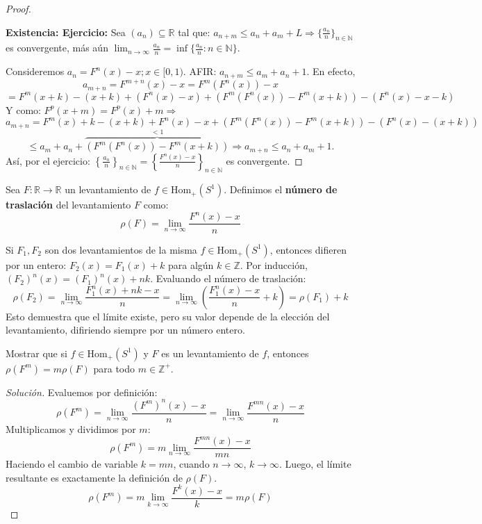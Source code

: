 \begin{proof}
\begin{figure}[htbp]
	\end{figure}
	
	\textbf{Existencia: Ejercicio:} Sea $(a_n) \subseteq \mathbb{R}$ tal que: $a_{n+m} \le a_n + a_m + L \Rightarrow \{\frac{a_n}{n}\}_{n \in \mathbb{N}}$ es convergente, más aún $\lim_{n \to \infty} \frac{a_n}{n} = \inf \{ \frac{a_n}{n} : n \in \mathbb{N} \}$.
	
	Consideremos $a_n = F^n(x) - x ; x \in [0,1)$. AFIR: $a_{n+m} \le a_m + a_n + 1$. En efecto,
	$$ a_{m+n} = F^{m+n}(x) - x = F^m(F^n(x)) - x $$
	$$ = F^m(x+k) - (x+k) + (F^n(x) - x) + (F^m(F^n(x)) - F^m(x+k)) - (F^n(x) - x - k) $$
	Y como: $F^p(x+m) = F^p(x)+m \Rightarrow$
	$$ a_{m+n} = F^m(x) + k - (x+k) + F^n(x) - x + (F^m(F^n(x)) - F^m(x+k)) - (F^n(x) - (x+k)) $$
	$$ \le a_m + a_n + \overbrace{(F^m(F^n(x)) - F^m(x+k))}^{< 1} \Rightarrow a_{m+n} \le a_n + a_m + 1. $$
	Así, por el ejercicio: $\left\{ \frac{a_n}{n} \right\}_{n \in \mathbb{N}} = \left\{ \frac{F^n(x)-x}{n} \right\}_{n \in \mathbb{N}}$ es convergente.
\end{proof}

\begin{definicion}
	Sea $F: \mathbb{R} \to \mathbb{R}$ un levantamiento de $f \in \text{Hom}_+(S^1)$. Definimos el \textbf{número de traslación} del levantamiento $F$ como:
	$$ \rho(F) = \lim_{n \to \infty} \frac{F^n(x) - x}{n} $$
\end{definicion}

\begin{observacion}
	Si $F_1, F_2$ son dos levantamientos de la misma $f \in \text{Hom}_+(S^1)$, entonces difieren por un entero: $F_2(x) = F_1(x) + k$ para algún $k \in \mathbb{Z}$.
	Por inducción, $(F_2)^n(x) = (F_1)^n(x) + n k$.
	Evaluando el número de traslación:
	$$ \rho(F_2) = \lim_{n \to \infty} \frac{F_1^n(x) + nk - x}{n} = \lim_{n \to \infty} \left( \frac{F_1^n(x) - x}{n} + k \right) = \rho(F_1) + k $$
	Esto demuestra que el límite existe, pero su valor depende de la elección del levantamiento, difiriendo siempre por un número entero.
\end{observacion}

\begin{ejercicio}
	Mostrar que si $f \in \text{Hom}_+(S^1)$ y $F$ es un levantamiento de $f$, entonces $\rho(F^m) = m \rho(F)$ para todo $m \in \mathbb{Z}^+$.
\end{ejercicio}
\begin{proof}[Solución]
	Evaluemos por definición:
	$$ \rho(F^m) = \lim_{n \to \infty} \frac{(F^m)^n(x) - x}{n} = \lim_{n \to \infty} \frac{F^{mn}(x) - x}{n} $$
	Multiplicamos y dividimos por $m$:
	$$ \rho(F^m) = m \lim_{n \to \infty} \frac{F^{mn}(x) - x}{mn} $$
	Haciendo el cambio de variable $k = mn$, cuando $n \to \infty$, $k \to \infty$. Luego, el límite resultante es exactamente la definición de $\rho(F)$.
	$$ \rho(F^m) = m \lim_{k \to \infty} \frac{F^k(x) - x}{k} = m \rho(F) $$
\end{proof}

